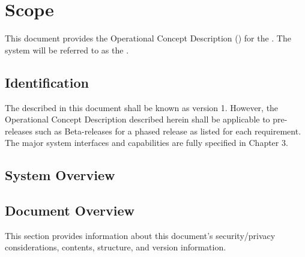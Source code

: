 
\chapter{Scope}
\label{loc:Scope}


This document provides the Operational Concept Description (\OCD) for the \ThisSystem. 
The system will be referred to as the \ThisSys.

\section{Identification}
\label{loc:Identification}


The \ThisSystem described in this document shall be known as \ThisSys version 1.
However, the Operational Concept Description {\OCD} described herein shall be applicable to pre-releases such as Beta-releases for a phased release as listed for each requirement.
The major system interfaces and capabilities are fully specified in Chapter 3.

\section{System Overview}
\label{loc:SystemOverview}







\newpage
\section{Document Overview}
\label{loc:DocumentOverview}


This section provides information about this document's security/privacy considerations, contents, structure, and version information.






